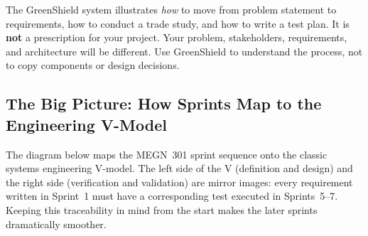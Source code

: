 \documentclass[11pt,letterpaper,twoside,openany]{book}
\begin{document}
\begin{warningbox}
The GreenShield system illustrates \emph{how} to move from problem statement to requirements, how to conduct a trade study, and how to write a test plan. It is \textbf{not} a prescription for your project. Your problem, stakeholders, requirements, and architecture will be different. Use GreenShield to understand the process, not to copy components or design decisions.
\end{warningbox}


\subsection*{The Big Picture: How Sprints Map to the Engineering V-Model}

The diagram below maps the MEGN~301 sprint sequence onto the classic systems engineering V-model. The left side of the V (definition and design) and the right side (verification and validation) are mirror images: every requirement written in Sprint~1 must have a corresponding test executed in Sprints~5--7. Keeping this traceability in mind from the start makes the later sprints dramatically smoother.
\end{document}

